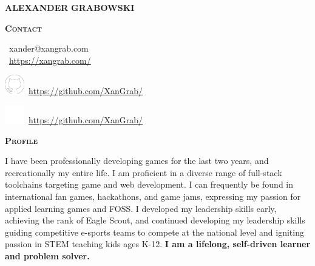 \documentclass[11pt, a4paper]{article}
\newcommand{\headleft}[1]{\vspace*{3ex}\textsc{\textbf{#1}}\par%
    \vspace*{-1.5ex}\hrulefill\par\vspace*{0.7ex}}
\begin{document}
\setlength{\topskip}{0pt}
\setlength{\parindent}{0pt}
\setlength{\parskip}{0pt}
\setlength{\fboxsep}{0pt}
\pagestyle{empty}
\raggedbottom

\begin{minipage}[t]{0.33\textwidth} %
\colorbox{cvblue}{\begin{minipage}[t][5mm][t]{\textwidth}\null\hfill\null\end{minipage}}

\vspace{-.2ex} %
\colorbox{cvblue!90}{\color{white}  %
\textwidth\relax%
\begin{minipage}[t][293mm][t]{0.82\textwidth}
\raggedright
\vspace*{2.0ex}

\begin{center}
    \Huge \textbf{ALEXANDER}\vspace{0.5ex}
    \textbf{GRABOWSKI} \normalsize 
\end{center}


\vspace*{-2.5ex} 

\headleft{Contact}
\small %
\Letter\ {\small  xander@xangrab.com} \\[0.4ex]

\Mundus\ \href{https://xangrab.com/}{https://xangrab.com/}\vspace{0.5ex}

\includegraphics[height=1.6ex]{github.png}\ \href{https://github.com/XanGrab/}{https://github.com/XanGrab/} \\[0.1ex] \vspace{0.5ex}

\includegraphics[height=1.6ex]{itchio-textless-white.png}\ \href{https://github.com/XanGrab/}{https://github.com/XanGrab/} \\[0.1ex]

\normalsize

\headleft{Profile}
I have been professionally developing games for the last two years, and recreationally my entire life. I am proficient in a diverse range of full-stack toolchains targeting game and web development. I can
frequently be found in international fan games, hackathons, and game jams, expressing my passion for applied learning games and FOSS. I developed my leadership skills early, achieving the rank of Eagle Scout, and continued developing my leadership skills guiding competitive e-sports teams to compete at the national level and igniting passion in STEM teaching kids ages K-12. \textbf{I am a lifelong, self-driven learner and problem solver.}


\end{minipage}}
\end{minipage}
\end{document}
